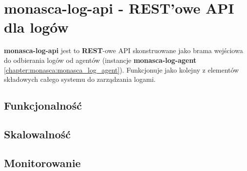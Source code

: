 \section{monasca-log-api - REST'owe API dla logów}
    \label{chapter:monasca:monasca_log_api}
    
    \textbf{monasca-log-api} jest to \textbf{REST}-owe API skonstruowane jako
    brama wejściowa do odbierania logów od agentów (instancje \textbf{monasca-log-agent}
    \ref{chapter:monasca:monasca_log_agent}). Funkcjonuje jako kolejny z elementów składowych całego systemu do
    zarządzania logami.

    \subsection{Funkcjonalność}
    \subsection{Skalowalność}
    \subsection{Monitorowanie}